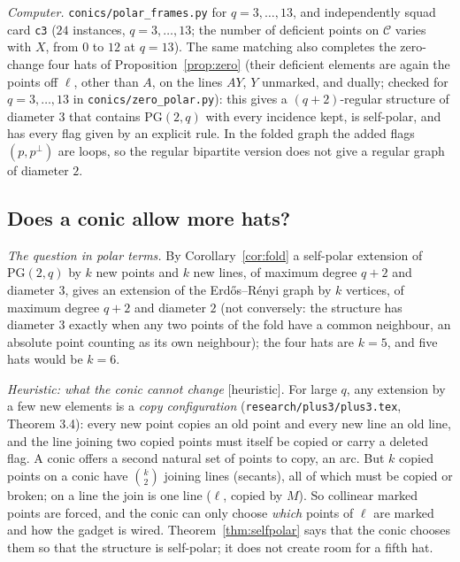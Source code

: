\documentclass[11pt]{amsart}
\theoremstyle{definition}
\theoremstyle{remark}
\newcommand{\cC}{\mathcal{C}}
\newcommand{\PG}{\mathrm{PG}}
\newcommand{\status}[1]{\textup{[#1]}}
\begin{document}
\emph{Computer.} \texttt{conics/polar\_frames.py} for $q=3,\dots,13$, and independently squad card \texttt{c3}
($24$ instances, $q=3,\dots,13$; the number of deficient points on $\cC$ varies with $X$, from $0$ to $12$ at
$q=13$). The same matching also completes the zero-change four hats of Proposition~\ref{prop:zero} (their deficient
elements are again the points off $\ell$, other than $A$, on the lines $AY$, $Y$ unmarked, and dually; checked for
$q=3,\dots,13$ in \texttt{conics/zero\_polar.py}): this gives a $(q+2)$-regular structure of diameter $3$ that
contains $\PG(2,q)$ with every incidence kept, is self-polar, and has every flag given by an explicit rule. In the
folded graph the added flags $(p,p^\perp)$ are loops, so the regular bipartite version does not give a regular graph
of diameter $2$.

\subsection{Does a conic allow more hats?}
\emph{The question in polar terms.} By Corollary~\ref{cor:fold} a self-polar extension of $\PG(2,q)$ by $k$ new
points and $k$ new lines, of maximum degree $q+2$ and diameter $3$, gives an extension of the Erd\H{o}s--R\'enyi
graph by $k$ vertices, of maximum degree $q+2$ and diameter $2$ (not conversely: the structure has diameter $3$ exactly
when any two points of the fold have a common neighbour, an absolute point counting as its own neighbour); the four
hats are $k=5$, and five hats would be $k=6$.

\emph{Heuristic: what the conic cannot change} \status{heuristic}. For large $q$, any extension by a few new elements
is a \emph{copy configuration} (\texttt{research/plus3/plus3.tex}, Theorem 3.4): every new point copies an old point
and every new line an old line, and the line joining two copied points must itself be copied or carry a deleted flag.
A conic offers a second natural set of points to copy, an arc. But $k$ copied points on a conic have $\binom k2$
joining lines (secants), all of which must be copied or broken; on a line the join is one line ($\ell$, copied by
$M$). So collinear marked points are forced, and the conic can only choose \emph{which} points of $\ell$ are marked
and how the gadget is wired. Theorem~\ref{thm:selfpolar} says that the conic chooses them so that the structure is
self-polar; it does not create room for a fifth hat.
\end{document}
